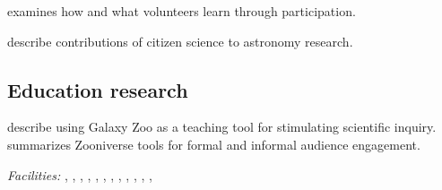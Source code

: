 \documentclass[twocolumn]{aastex6}
\begin{document}
\citet{klo13,pra13,mas16} examines how and what volunteers learn through participation.

\citet{chr12,mad14} describe contributions of citizen science to astronomy research.

\subsection{Education research}

\citet{sla11} describe using Galaxy Zoo as a teaching tool for stimulating scientific inquiry. \citet{bor13} summarizes Zooniverse tools for formal and informal audience engagement.


\acknowledgments

{\it Facilities:} 
,
,
,
,
,
,
,
,
,
,
,
,


\end{document}
